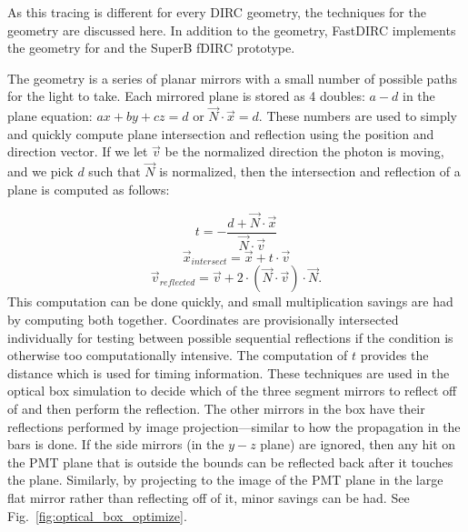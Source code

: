 As this tracing is different for every DIRC geometry, the techniques for the \gluex geometry are discussed here.  In addition to the \gluex geometry, FastDIRC implements the geometry for \babar and the SuperB fDIRC prototype.

The \gluex geometry is a series of planar mirrors with a small number of possible paths for the light to take.  Each mirrored plane  is stored as 4 doubles: $a-d$ in the plane equation: $ax+by+cz=d$ or $\vec{N} \cdot \vec{x} = d$.  These numbers are used to simply and quickly compute plane intersection and reflection using the position and direction vector.  If we let $\vec{v}$ be the normalized direction the photon is moving, and we pick $d$ such that $\vec{N}$ is normalized, then the intersection and reflection of a plane is computed as follows:

\begin{equation}
t = -\frac{d + \vec{N} \cdot \vec{x}}{\vec{N} \cdot \vec{v}}
\end{equation}
\begin{equation}
\vec{x}_{intersect} = \vec{x} + t \cdot \vec{v}
\end{equation}
\begin{equation}
\vec{v}_{reflected} = \vec{v} + 2 \cdot (\vec{N} \cdot \vec{v}) \cdot \vec{N}.
\end{equation}
This computation can be done quickly, and small multiplication savings are had by computing both together.  Coordinates are provisionally intersected individually for testing between possible sequential reflections if the condition is otherwise too computationally intensive.  The computation of $t$ provides the distance which is used for timing information.  These techniques are used in the \gluex optical box simulation to decide which of the three segment mirrors to reflect off of and then perform the reflection.  The other mirrors in the box have their reflections performed by image projection---similar to how the propagation in the bars is done.  If the side mirrors (in the $y-z$ plane) are ignored, then any hit on the PMT plane that is outside the bounds can be reflected back after it touches the plane.  Similarly, by projecting to the image of the PMT plane in the large flat mirror rather than reflecting off of it, minor savings can be had.  See Fig.~\ref{fig:optical_box_optimize}.

